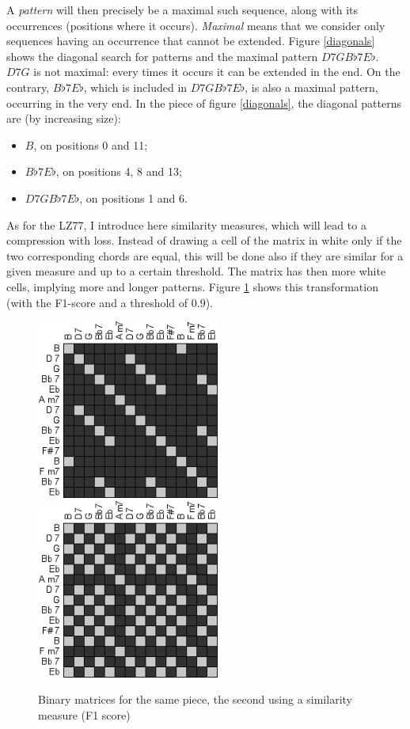 \documentclass[a4paper,10pt]{article}
\begin{document}
A \emph{pattern} will then precisely be a maximal such sequence, along with its occurrences (positions where it occurs). \emph{Maximal} means that we consider only sequences having an occurrence that cannot be extended. Figure \ref{diagonals} shows the diagonal search for patterns and the maximal pattern $D7GB\flat 7E\flat$. $D7G$ is not maximal: every times it occurs it can be extended in the end. On the contrary, $B\flat 7E\flat$, which is included in $D7GB\flat 7E\flat$, is also a maximal pattern, occurring in the very end. In the piece of figure \ref{diagonals}, the diagonal patterns are (by increasing size):

\begin{itemize}
\item $B$, on positions 0 and 11;
\item $B\flat 7E\flat$, on positions 4, 8 and 13;
\item $D7GB\flat 7E\flat$, on positions 1 and 6.
\end{itemize}

As for the LZ77, I introduce here similarity measures, which will lead to a compression with loss. Instead of drawing a cell of the matrix in white only if the two corresponding chords are equal, this will be done also if they are similar for a given measure and up to a certain threshold. The matrix has then more white cells, implying more and longer patterns. Figure \ref{loose} shows this transformation (with the F1-score and a threshold of $0.9$).

\begin{figure}
\centering
\includegraphics[width=6cm]{images/diagonals1.jpg}\hspace{1cm}
\includegraphics[width=6cm]{images/diagonals3.jpg}
\caption{Binary matrices for the same piece, the second using a similarity measure (F1 score)\label{loose}}
\end{figure}
\end{document}
